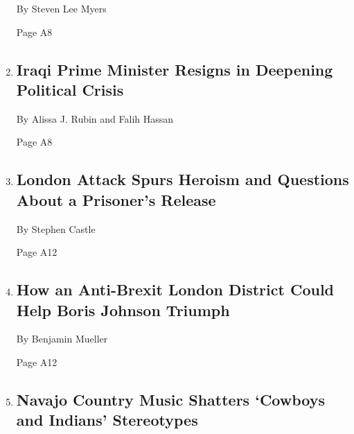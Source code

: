 \begin{enumerate}
  By Steven Lee Myers

  Page A8
\item
  \href{/2019/11/30/world/middleeast/adel-abdul-mahdi-resigns-iraq.html}{}

  \hypertarget{iraqi-prime-minister-resigns-in-deepening-political-crisis}{%
  \subsection{Iraqi Prime Minister Resigns in Deepening Political
  Crisis}\label{iraqi-prime-minister-resigns-in-deepening-political-crisis}}

  By Alissa J. Rubin and Falih Hassan

  Page A8
\item
  \href{/2019/11/30/world/europe/london-bridge-attack.html}{}

  \hypertarget{london-attack-spurs-heroism-and-questions-about-a-prisoners-release}{%
  \subsection{London Attack Spurs Heroism and Questions About a
  Prisoner's
  Release}\label{london-attack-spurs-heroism-and-questions-about-a-prisoners-release}}

  By Stephen Castle

  Page A12
\item
  \href{/2019/11/30/world/europe/labour-tories-johnson-corbyn-westminster.html}{}

  \hypertarget{how-an-anti-brexit-london-district-could-help-boris-johnson-triumph}{%
  \subsection{How an Anti-Brexit London District Could Help Boris
  Johnson
  Triumph}\label{how-an-anti-brexit-london-district-could-help-boris-johnson-triumph}}

  By Benjamin Mueller

  Page A12
\item
  \href{/2019/11/30/us/navajo-country-music.html}{}

  \hypertarget{navajo-country-music-shatters-cowboys-and-indians-stereotypes}{%
  \subsection{Navajo Country Music Shatters `Cowboys and Indians'
  Stereotypes}\label{navajo-country-music-shatters-cowboys-and-indians-stereotypes}}


\end{enumerate}
